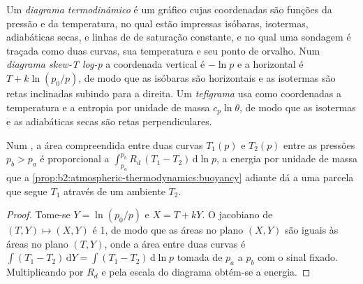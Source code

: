 \begin{definition}\label{def:b2:atmospheric-thermodynamics:diagram}
Um \emph{diagrama termodinâmico} é um gráfico cujas coordenadas são
funções da pressão e da temperatura, no qual estão impressas isóbaras, isotermas, adiabáticas secas,  e linhas de  de saturação constante, e no qual uma sondagem é
traçada como duas curvas, sua temperatura e seu ponto de orvalho. Num \emph{diagrama skew-T
log-p} a coordenada vertical é $-\ln p$ e a horizontal é
$T + k\ln(p_0/p)$, de modo que as isóbaras são horizontais e as isotermas são retas inclinadas subindo para
a direita. Um \emph{tefigrama} usa como coordenadas a temperatura e a entropia por unidade de
massa $c_p\ln\theta$, de modo que as isotermas e as adiabáticas secas são retas
perpendiculares.
\end{definition}

\begin{proposition}\label{prop:b2:atmospheric-thermodynamics:areas}
Num , a área compreendida entre duas curvas $T_1(p)$ e $T_2(p)$ entre as
pressões $p_b > p_a$ é proporcional a $\int_{p_a}^{p_b} R_d\,(T_1 - T_2)\,\mathrm{d}\ln p$,
a energia por unidade de massa que a \cref{prop:b2:atmospheric-thermodynamics:buoyancy} adiante dá a
uma parcela que segue $T_1$ através de um ambiente $T_2$.
\end{proposition}

\begin{proof}
Tome-se $Y = \ln(p_0/p)$ e $X = T + kY$. O jacobiano de $(T, Y) \mapsto (X, Y)$ é 1, de modo que as áreas no
plano $(X, Y)$ são iguais às áreas no plano $(T, Y)$, onde a área entre duas curvas é
$\int (T_1 - T_2)\,\mathrm{d}Y = \int (T_1 - T_2)\,\mathrm{d}\ln p$ tomada de $p_a$ a $p_b$
com o sinal fixado. Multiplicando por $R_d$ e pela escala do diagrama obtém-se a energia.
\end{proof}

